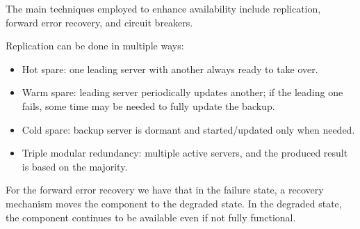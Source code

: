 The main techniques employed to enhance availability include replication, forward error recovery, and circuit breakers.

Replication can be done in multiple ways: 
\begin{itemize}
    \item Hot spare: one leading server with another always ready to take over.
    \item Warm spare: leading server periodically updates another; if the leading one fails, some time may be needed to fully update the backup.
    \item Cold spare: backup server is dormant and started/updated only when needed.
    \item Triple modular redundancy: multiple active servers, and the produced result is based on the majority.
\end{itemize}

For the forward error recovery we have that in the failure state, a recovery mechanism moves the component to the degraded state.
In the degraded state, the component continues to be available even if not fully functional.